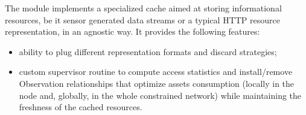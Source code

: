 The \href{https://github.com/koanlogic/webthings/tree/master/bits/kache}{} module implements a specialized cache aimed at storing informational resources, be it sensor generated data streams or a typical HTTP resource representation, in an agnostic way.  It provides the following features: 
\begin{itemize}
\item ability to plug different representation formats and discard strategies;
\item custom supervisor routine to compute access statistics and install/remove Observation relationships that optimize assets consumption (locally in the node and, globally, in the whole constrained network) while maintaining the freshness of the cached resources.
\end{itemize}
